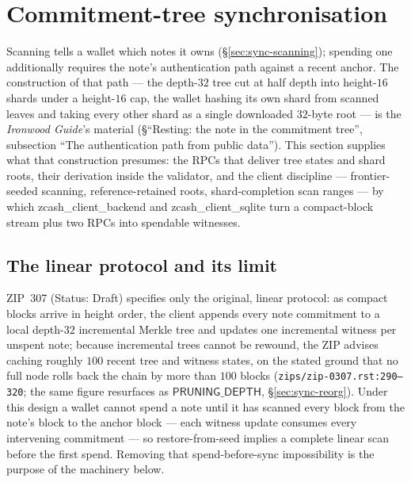 \documentclass[11pt,a4paper]{article}
\theoremstyle{definition}
\begin{document}
\section{Commitment-tree synchronisation}\label{sec:sync-tree}

Scanning tells a wallet which notes it owns (\S\ref{sec:sync-scanning});
spending one additionally requires the note's authentication path against
a recent anchor. The construction of that path --- the depth-$32$ tree cut
at half depth into height-$16$ shards under a height-$16$ cap, the wallet
hashing its own shard from scanned leaves and taking every other shard as
a single downloaded $32$-byte root --- is the \emph{Ironwood Guide}'s
material (\S``Resting: the note in the commitment tree'', subsection
``The authentication path from public data'').
This section supplies what that construction presumes: the RPCs that
deliver tree states and shard roots, their derivation inside the
validator, and the client discipline --- frontier-seeded scanning,
reference-retained roots, shard-completion scan ranges --- by which
\textsf{zcash\_client\_backend} and \textsf{zcash\_client\_sqlite} turn a
compact-block stream plus two RPCs into spendable witnesses.

\subsection{The linear protocol and its limit}\label{sec:sync-tree-linear}

ZIP~307 (Status: Draft) specifies only the original, linear protocol: as
compact blocks arrive in height order, the client appends every note
commitment to a local depth-$32$ incremental Merkle tree and updates one
incremental witness per unspent note; because incremental trees cannot be
rewound, the ZIP advises caching roughly $100$ recent tree and witness
states, on the stated ground that no full node rolls back the chain by
more than $100$ blocks (\texttt{zips/zip-0307.rst:290--320}; the same
figure resurfaces as $\mathsf{PRUNING\_DEPTH}$, \S\ref{sec:sync-reorg}).
Under this design a wallet cannot spend a note until it has scanned every
block from the note's block to the anchor block --- each witness update
consumes every intervening commitment --- so restore-from-seed implies a
complete linear scan before the first spend. Removing that
spend-before-sync impossibility is the purpose of the machinery below.
\end{document}
